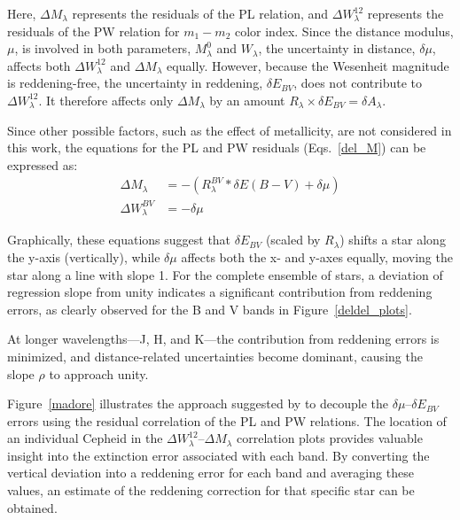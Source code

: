 Here, $\Delta M_\lambda$ represents the residuals of the PL relation, and $\Delta W_\lambda^{12}$ represents the residuals of the PW relation for $m_1 - m_2$ color index. Since the distance modulus, $\mu$, is involved in both parameters, $M^0_\lambda$ and $W_\lambda$, the uncertainty in distance, $\delta \mu$, affects both $\Delta W_\lambda^{12}$ and $\Delta M_\lambda$ equally. However, because the Wesenheit magnitude is reddening-free, the uncertainty in reddening, $\delta E_{BV}$, does not contribute to $\Delta W_\lambda^{12}$. It therefore affects only $\Delta M_\lambda$ by an amount $ R_\lambda \times \delta E_{BV}   = \delta A_\lambda$. 

Since other possible factors, such as the effect of metallicity, are not considered in this work, the equations for the PL and PW residuals (Eqs.~\ref{del_M}) can be expressed as:
\begin{align}
    \label{error}
    \Delta M_\lambda & = - ( R_\lambda^{BV}* \delta E(B-V) + \delta \mu)\\
    \Delta W_\lambda^{BV} & = - \delta \mu
\end{align}



Graphically, these equations suggest that $\delta E_{BV}$ (scaled by $R_\lambda$) shifts a star along the y-axis (vertically), while $\delta \mu$ affects both the x- and y-axes equally, moving the star along a line with slope 1. For the complete ensemble of stars, a deviation of regression slope from unity indicates a significant contribution from reddening errors, as clearly observed for the B and V bands in Figure~\ref{deldel_plots}. 


At longer wavelengths---J, H, and K---the contribution from reddening errors is minimized, and distance-related uncertainties become dominant, causing the slope $\rho$ to approach unity.

Figure~\ref{madore} illustrates the approach suggested by \cite{2017madore} to decouple the $\delta \mu$--$\delta E_{BV}$ errors using the residual correlation of the PL and PW relations. The location of an individual Cepheid in the $\Delta W_\lambda^{12}$--$\Delta M_\lambda$ correlation plots provides valuable insight into the extinction error associated with each band. By converting the vertical deviation into a reddening error for each band and averaging these values, an estimate of the reddening correction for that specific star can be obtained. 

